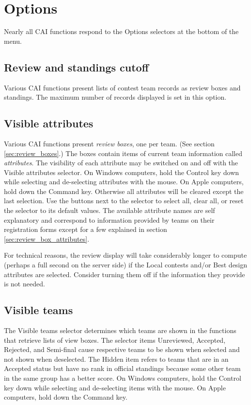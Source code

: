 \documentclass[11pt,letterpaper]{refart}
\def\ui#1{\textsf{#1}}
\begin{document}
\section{Options}
Nearly all CAI functions respond to the \ui{Options} selectors at the
bottom of the menu.

\subsection{Review and standings cutoff}
Various CAI functions present lists of contest team records as review
boxes and standings. The maximum
number of records displayed is set in this option.
 
\subsection{Visible attributes}
Various CAI functions present \emph{review boxes}, one per team.  (See
section \ref{sec:review_boxes}.) The boxes contain items of current
team information called \emph{attributes}.  The visibility of each
attribute may be switched on and off with the \ui{Visible attributes}
selector. On Windows computers, hold the Control key down while
selecting and de-selecting attributes with the mouse. On Apple
computers, hold down the Command key. Otherwise all attributes will be
cleared except the last selection. Use the buttons next to the
selector to select all, clear all, or reset the selector to its
default values. The available attribute names are self explanatory and
correspond to information provided by teams on their registration
forms except for a few explained in section
\ref{sec:review_box_attributes}.

For technical reasons, the review display will take considerably
longer to compute (perhaps a full second on the server side) if the
\ui{Local contests} and/or \ui{Best design} attributes are
selected. Consider turning them off if the information they provide is
not needed.

\subsection{Visible teams}
The \ui{Visible teams} selector determines which teams are shown in
the functions that retrieve lists of view boxes. The selector items
\ui{Unreviewed}, \ui{Accepted}, \ui{Rejected}, and \ui{Semi-final}
cause respective teams to be shown when selected and not shown when
deselected.  The \ui{Hidden} item refers to teams that are in an
\ui{Accepted} status but have no rank in official standings because
some other team in the same group has a better score. On Windows
computers, hold the Control key down while selecting and de-selecting
items with the mouse. On Apple computers, hold down the Command key.
\end{document}
